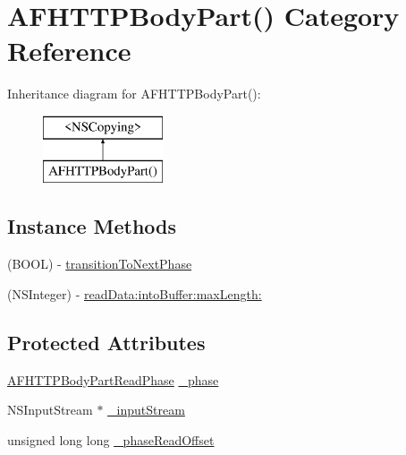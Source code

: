 \hypertarget{category_a_f_h_t_t_p_body_part_07_08}{\section{A\-F\-H\-T\-T\-P\-Body\-Part() Category Reference}
\label{category_a_f_h_t_t_p_body_part_07_08}
}
Inheritance diagram for A\-F\-H\-T\-T\-P\-Body\-Part()\-:\begin{figure}[H]
\begin{center}
\leavevmode
\includegraphics[height=2.000000cm]{category_a_f_h_t_t_p_body_part_07_08}
\end{center}
\end{figure}
\subsection*{Instance Methods}
\begin{DoxyCompactItemize}
\item 
(B\-O\-O\-L) -\/ \hyperlink{category_a_f_h_t_t_p_body_part_07_08_a7a1d3c4cecb39d49eacd5d93a6ec0e53}{transition\-To\-Next\-Phase}
\item 
(N\-S\-Integer) -\/ \hyperlink{category_a_f_h_t_t_p_body_part_07_08_a70ad0187fac159bc5a2aabc37bf6da06}{read\-Data\-:into\-Buffer\-:max\-Length\-:}
\end{DoxyCompactItemize}
\subsection*{Protected Attributes}
\begin{DoxyCompactItemize}
\item 
\hyperlink{_a_f_h_t_t_p_client_8m_a30fbec9b9b3c7c657b209a49c5a3b80f}{A\-F\-H\-T\-T\-P\-Body\-Part\-Read\-Phase} \hyperlink{category_a_f_h_t_t_p_body_part_07_08_a9e462f49c6b01eb159ee18e4dfa9f2dc}{\-\_\-phase}
\item 
N\-S\-Input\-Stream $\ast$ \hyperlink{category_a_f_h_t_t_p_body_part_07_08_a3ff59819a038e5b89a041b6e59b9f858}{\-\_\-input\-Stream}
\item 
unsigned long long \hyperlink{category_a_f_h_t_t_p_body_part_07_08_ab23d067a3e044b62a837e737042cd721}{\-\_\-phase\-Read\-Offset}
\end{DoxyCompactItemize}


